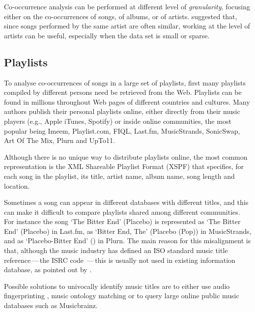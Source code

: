Co-occurrence analysis can be performed at different level of \emph{granularity}, focusing either on the co-occurrences of songs, of albums, or of artists.
\citet{Hauver01} suggested that, since songs performed by the same artist are often similar, working at the level of artists can be useful, especially when the data set is small or sparse.


\subsection{Playlists} %
\label{sub:retrieving_playlists}

To analyse co-occurrences of songs in a large set of playlists, first many playlists compiled by different persons need be retrieved from the Web.
%
Playlists can be found in millions throughout Web pages of different countries and cultures.
Many authors publish their personal playlists online, either directly from their music players (e.g., Apple iTunes, Spotify) or inside online communities, the most popular being Imeem, Playlist.com, FIQL, Last.fm, MusicStrands, SonicSwap, Art Of The Mix, Plurn and UpTo11.

Although there is no unique way to distribute playlists online, the most common representation is the XML Shareable Playlist Format (XSPF) \cite{XSPF06} that specifies, for each song in the playlist, its title, artist name, album name, song length and location.


Sometimes a song can appear in different databases with different titles, and this can make it difficult to compare playlists shared among different communities. 
For instance the song `The Bitter End' (Placebo) is represented as `The Bitter End' (Placebo) in Last.fm, as `Bitter End, The' (Placebo (Pop)) in MusicStrands, and as `Placebo-Bitter End' () in Plurn.
%
The main reason for this misalignment is that, although the music industry has defined an ISO standard music title reference\,---\,the ISRC code \cite{ISRC03}\,---\,this is usually not used in existing information database, as pointed out by \citet{Pachet01}.

Possible solutions to univocally identify music titles are to either use audio fingerprinting \cite{Cano05}, music ontology matching \cite{Raimond07b} or to query large online public music databases such as Musicbrainz.


